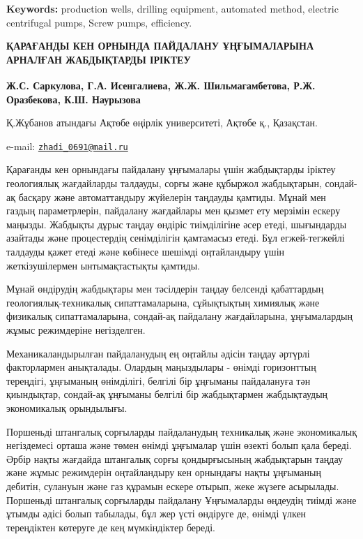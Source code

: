{\bfseries Keywords:} production wells, drilling equipment, automated
method, electric centrifugal pumps, Screw pumps, efficiency.

\begin{articleheader}
{\bfseries ҚАРАҒАНДЫ КЕН ОРНЫНДА ПАЙДАЛАНУ ҰҢҒЫМАЛАРЫНА АРНАЛҒАН
ЖАБДЫҚТАРДЫ ІРІКТЕУ}

{\bfseries
Ж.С. Саркулова\textsuperscript{\envelope },
Г.А. Исенгалиева,
Ж.Ж. Шильмагамбетова,
Р.Ж. Оразбекова,
К.Ш. Наурызова
}
\end{articleheader}

\begin{affiliation}
Қ.Жұбанов атындағы Ақтөбе өңірлік университеті, Ақтөбе қ., Қазақстан.

e-mail: \href{mailto:zhadi\_0691@mail.ru}{\nolinkurl{zhadi\_0691@mail.ru}}
\end{affiliation}

Қарағанды кен орнындағы пайдалану ұңғымалары үшін жабдықтарды іріктеу
геологиялық жағдайларды талдауды, сорғы және құбыржол жабдықтарын,
сондай-ақ басқару және автоматтандыру жүйелерін таңдауды қамтиды. Мұнай
мен газдың параметрлерін, пайдалану жағдайлары мен қызмет ету мерзімін
ескеру маңызды. Жабдықты дұрыс таңдау өндіріс тиімділігіне әсер етеді,
шығындарды азайтады және процестердің сенімділігін қамтамасыз етеді. Бұл
егжей-тегжейлі талдауды қажет етеді және көбінесе шешімді оңтайландыру
үшін жеткізушілермен ынтымақтастықты қамтиды.

Мұнай өндірудің жабдықтары мен тәсілдерін таңдау белсенді қабаттардың
геологиялық-техникалық сипаттамаларына, сұйықтықтың химиялық және
физикалық сипаттамаларына, сондай-ақ пайдалану жағдайларына,
ұңғымалардың жұмыс режимдеріне негізделген.

Механикаландырылған пайдаланудың ең оңтайлы әдісін таңдау әртүрлі
факторлармен анықталады. Олардың маңыздылары - өнімді горизонттың
тереңдігі, ұңғыманың өнімділігі, белгілі бір ұңғыманы пайдалануға тән
қиындықтар, сондай-ақ ұңғыманы белгілі бір жабдықтармен жабдықтаудың
экономикалық орындылығы.

Поршеньді штангалық сорғыларды пайдаланудың техникалық және экономикалық
негіздемесі орташа және төмен өнімді ұңғымалар үшін өзекті болып қала
береді. Әрбір нақты жағдайда штангалық сорғы қондырғысының жабдықтарын
таңдау және жұмыс режимдерін оңтайландыру кен орнындағы нақты ұңғыманың
дебитін, сулануын және газ құрамын ескере отырып, жеке жүзеге асырылады.
Поршеньді штангалық сорғыларды пайдалану Ұңғымаларды өңдеудің тиімді
және ұтымды әдісі болып табылады, бұл жер үсті өндіруге де, өнімді үлкен
тереңдіктен көтеруге де кең мүмкіндіктер береді.


